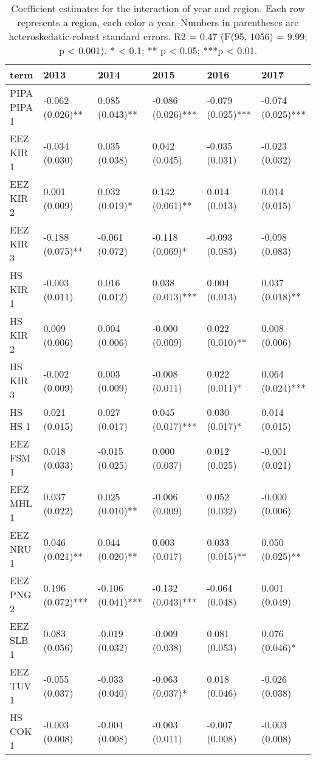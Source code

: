 \documentclass[11pt,]{article}
\begin{document}
\begin{table}

\caption{\label{tab:unnamed-chunk-16}\label{tab:mean_change}Coefficient estimates for the interaction of year and region. Each row represents a region, each color a year. Numbers in parentheses are heteroskedatic-robust standard errors. R2 = 0.47 (F(95, 1056) = 9.99; p < 0.001). * < 0.1; ** p < 0.05; ***p < 0.01.}
\centering
\begin{tabular}[t]{llllll}
\toprule
term & 2013 & 2014 & 2015 & 2016 & 2017\\
\midrule
PIPA PIPA 1 & -0.062 (0.026)** & 0.085 (0.043)** & -0.086 (0.026)*** & -0.079 (0.025)*** & -0.074 (0.025)***\\
EEZ KIR 1 & -0.034 (0.030) & 0.035 (0.038) & 0.042 (0.045) & -0.035 (0.031) & -0.023 (0.032)\\
EEZ KIR 2 & 0.001 (0.009) & 0.032 (0.019)* & 0.142 (0.061)** & 0.014 (0.013) & 0.014 (0.015)\\
EEZ KIR 3 & -0.188 (0.075)** & -0.061 (0.072) & -0.118 (0.069)* & -0.093 (0.083) & -0.098 (0.083)\\
HS KIR 1 & -0.003 (0.011) & 0.016 (0.012) & 0.038 (0.013)*** & 0.004 (0.013) & 0.037 (0.018)**\\
\addlinespace
HS KIR 2 & 0.009 (0.006) & 0.004 (0.006) & -0.000 (0.009) & 0.022 (0.010)** & 0.008 (0.006)\\
HS KIR 3 & -0.002 (0.009) & 0.003 (0.009) & -0.008 (0.011) & 0.022 (0.011)* & 0.064 (0.024)***\\
HS HS 1 & 0.021 (0.015) & 0.027 (0.017) & 0.045 (0.017)*** & 0.030 (0.017)* & 0.014 (0.015)\\
EEZ FSM 1 & 0.018 (0.033) & -0.015 (0.025) & 0.000 (0.037) & 0.012 (0.025) & -0.001 (0.021)\\
EEZ MHL 1 & 0.037 (0.022) & 0.025 (0.010)** & -0.006 (0.009) & 0.052 (0.032) & -0.000 (0.006)\\
\addlinespace
EEZ NRU 1 & 0.046 (0.021)** & 0.044 (0.020)** & 0.003 (0.017) & 0.033 (0.015)** & 0.050 (0.025)**\\
EEZ PNG 2 & 0.196 (0.072)*** & -0.106 (0.041)*** & -0.132 (0.043)*** & -0.064 (0.048) & 0.001 (0.049)\\
EEZ SLB 1 & 0.083 (0.056) & -0.019 (0.032) & -0.009 (0.038) & 0.081 (0.053) & 0.076 (0.046)*\\
EEZ TUV 1 & -0.055 (0.037) & -0.033 (0.040) & -0.063 (0.037)* & 0.018 (0.046) & -0.026 (0.038)\\
HS COK 1 & -0.003 (0.008) & -0.004 (0.008) & -0.003 (0.011) & -0.007 (0.008) & -0.003 (0.008)\\
\bottomrule
\end{tabular}
\end{table}
\end{document}
